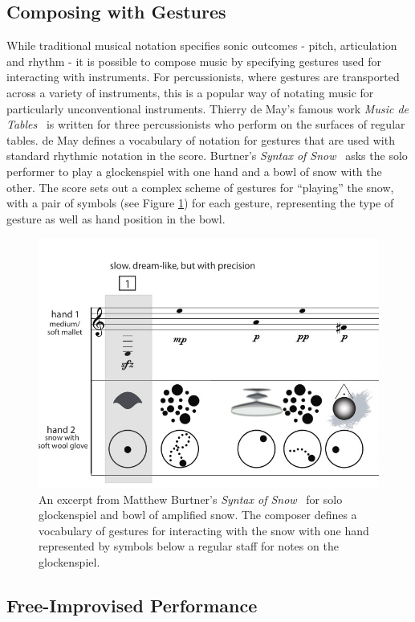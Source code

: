 \documentclass[graybox]{svmult}
\begin{document}
\subsection{Composing with Gestures}

While traditional musical notation specifies sonic outcomes - pitch,
articulation and rhythm - it is possible to compose music by
specifying gestures used for interacting with instruments. For
percussionists, where gestures are transported across a variety of
instruments, this is a popular way of notating music for particularly
unconventional instruments. Thierry de May's famous work \emph{Music
de Tables}~\cite{May:1987fk} is written for three percussionists who
perform on the surfaces of regular tables. de May defines a vocabulary
of notation for gestures that are used with standard rhythmic notation
in the score. Burtner's \emph{Syntax of Snow}~\cite{Burtner:2011fk}
asks the solo performer to play a glockenspiel with one hand and a
bowl of snow with the other. The score sets out a complex scheme of
gestures for ``playing'' the snow, with a pair of symbols (see Figure
\ref{fig:SyntaxOfSnow}) for each gesture, representing the type of
gesture as well as hand position in the bowl.

\begin{figure}[h] \centering
\includegraphics[width=0.7\columnwidth]{figures/syntaxofsnow-excerpt.jpg}
\caption{An excerpt from Matthew Burtner's \emph{Syntax of
    Snow}~\cite{Burtner:2011fk} for solo glockenspiel and bowl of
  amplified snow. The composer defines a vocabulary of
  gestures for interacting with the snow with one hand represented by
  symbols below a regular staff for notes on the glockenspiel.}
\label{fig:SyntaxOfSnow}
\end{figure}

\subsection{Free-Improvised Performance}
\end{document}
